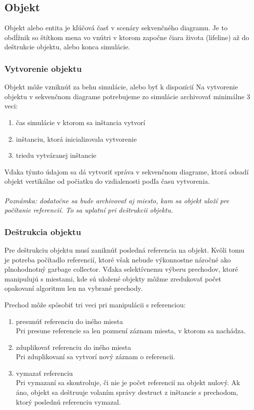 \subsection*{Objekt}
Objekt alebo entita je kľúčová časť v scenáry sekvenčného diagramu. Je to obdĺžnik so štítkom mena vo vnútri v ktorom započne čiara života (lifeline) až do deštrukcie objektu, alebo konca simulácie.

\subsubsection*{Vytvorenie objektu}
Objekt môže vzniknúť za behu simulácie, alebo byť k dispozícií
Na vytvorenie objektu v sekvenčnom diagrame potrebujeme zo simulácie archivovať minimálne 3 veci:

\begin{enumerate}
	\item čas simulácie v ktorom sa inštancia vytvorí
	\item inštanciu, ktorá inicializovala vytvorenie
	\item triedu vytváranej inštancie
\end{enumerate}
Vďaka týmto údajom sa dá vytvoriť správa v sekvenčnom diagrame, ktorá odsadí objekt vertikálne od počiatku do vzdialenosti podľa času vytvorenia.\\\\
\textit{Poznámka: dodatočne sa bude archivovať aj miesto, kam sa objekt uloží pre počítanie referencií. To sa uplatní pri deštrukcii objektu.}


\subsubsection*{Deštrukcia objektu}
Pre deštrukciu objektu musí zaniknúť posledná referencia na objekt. Kvôli tomu je potreba počítadlo referencií, ktoré však nebude výkonnostne náročné ako plnohodnotný garbage collector. Vďaka selektívnemu výberu prechodov, ktoré manipulujú s miestami, kde sú uložené objekty môžme zredukovať počet opakovaní algoritmu len na vybrané prechody.
\pagebreak

Prechod môže spôsobiť tri veci pri manipulácii s referenciou:
\begin{enumerate}
	\item presunúť referenciu do iného miesta\\
	Pri presune referencie sa len pozmení záznam miesta, v ktorom sa nachádza.
	\item zduplikovať referenciu do iného miesta\\
	Pri zduplikovaní sa vytvorí nový záznam o referencii.
	\item vymazať referenciu \\
	Pri vymazaní sa skontroluje, či nie je počet referencií na objekt nulový. Ak áno, objekt sa deštruuje volaním správy destruct z inštancie s prechodom, ktorý poslednú referenciu vymazal.
\end{enumerate}


